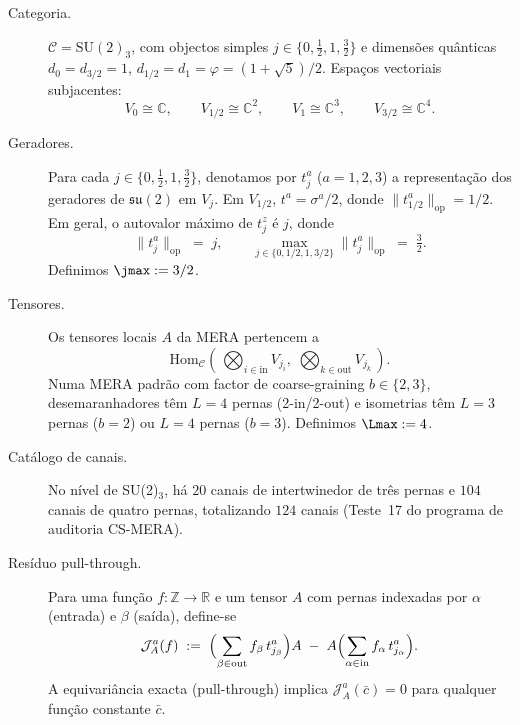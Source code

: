 \begin{description}
\item[Categoria.] $\mathcal{C} = \mathrm{SU}(2)_3$, com objectos simples
$j \in \{0, \tfrac{1}{2}, 1, \tfrac{3}{2}\}$ e dimensões quânticas
$d_0 = d_{3/2} = 1$, $d_{1/2} = d_1 = \varphi = (1+\sqrt{5})/2$.
Espaços vectoriais subjacentes:
\[
V_0 \cong \mathbb{C}, \qquad
V_{1/2} \cong \mathbb{C}^2, \qquad
V_1 \cong \mathbb{C}^3, \qquad
V_{3/2} \cong \mathbb{C}^4.
\]

\item[Geradores.] Para cada $j \in \{0, \tfrac{1}{2}, 1, \tfrac{3}{2}\}$,
denotamos por $t_j^a$ ($a=1,2,3$) a representação dos geradores de
$\mathfrak{su}(2)$ em $V_j$. Em $V_{1/2}$, $t^a = \sigma^a/2$, donde
$\|t^a_{1/2}\|_{\mathrm{op}} = 1/2$. Em geral, o autovalor máximo
de $t^z_j$ é $j$, donde
\begin{equation}
  \|t^a_j\|_{\mathrm{op}} \;=\; j, \qquad
  \max_{j \in \{0,1/2,1,3/2\}} \|t^a_j\|_{\mathrm{op}} \;=\; \tfrac{3}{2}.
  \label{eq:norma_ta}
\end{equation}
Definimos $\jmax := 3/2$.

\item[Tensores.] Os tensores locais $A$ da MERA pertencem a
\[
  \mathrm{Hom}_{\mathcal{C}}\!\left(\,\bigotimes_{i \in \mathrm{in}} V_{j_i},\;
  \bigotimes_{k \in \mathrm{out}} V_{j_k}\,\right).
\]
Numa MERA padrão com factor de coarse-graining $b \in \{2,3\}$,
desemaranhadores têm $L = 4$ pernas (2-in/2-out) e isometrias têm
$L = 3$ pernas ($b=2$) ou $L = 4$ pernas ($b=3$). Definimos
$\Lmax := 4$.

\item[Catálogo de canais.] No nível de SU(2)$_3$, há $20$ canais de
intertwinedor de três pernas e $104$ canais de quatro pernas,
totalizando $124$ canais (Teste~17 do programa de auditoria CS-MERA).

\item[Resíduo pull-through.] Para uma função $f: \mathbb{Z} \to \mathbb{R}$
e um tensor $A$ com pernas indexadas por $\alpha$ (entrada) e $\beta$
(saída), define-se
\begin{equation}
  \mathcal{J}_A^a(f) \;:=\;
  \Bigl(\sum_{\beta \in \mathrm{out}} f_\beta \,t^a_{j_\beta}\Bigr) A
  \;-\; A \Bigl(\sum_{\alpha \in \mathrm{in}} f_\alpha \,t^a_{j_\alpha}\Bigr).
  \label{eq:def_residuo}
\end{equation}
A equivariância exacta (pull-through) implica $\mathcal{J}_A^a(\bar c) = 0$
para qualquer função constante $\bar c$.


\end{description}
